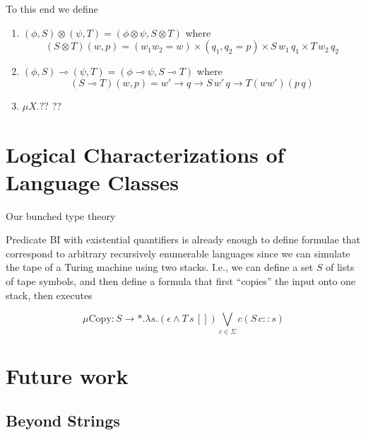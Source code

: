 \documentclass[sigconf,anonymous,review,screen]{acmart}
\newif\ifdraft
\newcommand{\pedro}[1]{\ifdraft{\color{red}[{\bf Pedro}: #1]}\fi}
\begin{document}
To this end we define
\pedro{I'm pretty sure that these definitions have been somewhat presented
  in ``Glueing and orthogonality for models of linear logic'' by Hyland and Schalk.
We should probably cite them so that we don't have to rederive their constructions and proofs here.}
\begin{enumerate}
\item $(\phi, S) \otimes (\psi, T) = (\phi \otimes \psi, S\otimes T)$ where
  \[ (S \otimes T)(w, p) = (w_1w_2 = w) \times (q_1,q_2 = p) \times S\,w_1\,q_1 \times T\,w_2\,q_2\]
\item $(\phi, S) \multimap (\psi, T) = (\phi \multimap \psi, S \multimap T)$ where
  \[ (S \multimap T)(w,p) = w' \to q \to S\,w'\,q \to T (ww') (p\,q) \]
\item $\mu X. ??$ ??
\end{enumerate}

\section{Logical Characterizations of Language Classes}

Our bunched type theory 

Predicate BI with existential quantifiers is already enough to define
formulae that correspond to arbitrary recursively enumerable languages
since we can simulate the tape of a Turing machine using two
stacks. I.e., we can define a set $S$ of lists of tape symbols, and
then define a formula that first ``copies'' the input onto one stack, then executes

\[ \mu \textrm{Copy} : S \to *. \lambda s. (\epsilon \wedge T\,s\,[])\bigvee_{c \in \Sigma} c (S\,{c::s}) \]



\section{Future work}

\subsection{Beyond Strings}
\end{document}

